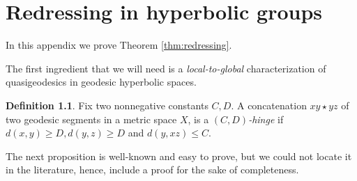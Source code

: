 \documentclass[12pt]{amsbook}%
\theoremstyle{definition}
\newtheorem{defi}[thm]{Definition}
\theoremstyle{remark}
\numberwithin{section}{chapter}
\numberwithin{subsection}{section}
\numberwithin{figure}{chapter}
\DeclareMathOperator{\C}{\mathbb{C}}
\DeclareMathOperator{\R}{\mathbb{R}}
\def\cE{{\mathscr{E}}}
\def\Ga{\Gamma}
\def\ga{\gamma}
\def\geo{\partial_\infty}
\begin{document}
{{%
%
% 
% 
% 
% 
% 
% 
% 
% 
%
 
 
 
 
 
 

\appendix 




\chapter[Appendix A]{%
Redressing in hyperbolic groups}\label{sec:appendixA}

In this appendix we prove Theorem \ref{thm:redressing}. 


\medskip
The first ingredient that we will need is a {\em local-to-global} characterization of quasigeodesics in geodesic hyperbolic spaces. 


\begin{defi}
Fix two nonnegative constants $C, D$. A concatenation $xy\star yz$ of two geodesic segments in a metric space $X$, 
is a {\em $(C,D)$-hinge} if $d(x,y)\geqslant D, d(y,z)\geqslant D$ and $d(y, xz)\leqslant C$. 
\end{defi}

The next proposition is well-known and easy to prove, but we could not locate it in the literature, hence, include a proof for the sake of completeness. 

}}
\end{document}
